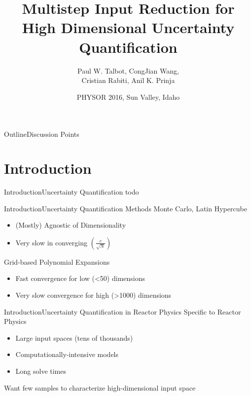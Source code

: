 \documentclass{beamer}
\title[Multistep Input Reduction]
{Multistep Input Reduction for High Dimensional Uncertainty Quantification}
\author[Talbot] %
{Paul W. Talbot\inst{1}, CongJian Wang\inst{2}, \\ Cristian Rabiti\inst{2}, Anil K. Prinja\inst{1}}
\institute[University of New Mexico] %
{
  \inst{1}%
  University of New Mexico\\
  \inst{2}
  Idaho National Laboratory
}
\date[PHYSOR 2016] %
{PHYSOR 2016, Sun Valley, Idaho}
\begin{document}
\begin{frame}
  \titlepage
\end{frame}

\begin{frame}{Outline}{Discussion Points}\vspace{-20pt}
  \tableofcontents%
\end{frame}

\section{Introduction}
\begin{frame}{Introduction}{Uncertainty Quantification}\vspace{-30pt}
  todo
\end{frame}
\begin{frame}{Introduction}{Uncertainty Quantification Methods}\vspace{-30pt}
  Monte Carlo, Latin Hypercube
  \begin{itemize}
    \item (Mostly) Agnostic of Dimensionality
    \item Very slow in converging $\left(\frac{c}{\sqrt{N}}\right)$
  \end{itemize}
  \vspace{15pt}
  Grid-based Polynomial Expansions
  \begin{itemize}
    \item Fast convergence for low (<50) dimensions
    \item Very slow convergence for high (>1000) dimensions
  \end{itemize}
\end{frame}
\begin{frame}{Introduction}{Uncertainty Quantification in Reactor Physics}\vspace{-30pt}
  Specific to Reactor Physics
  \begin{itemize}
    \item Large input spaces (tens of thousands)
    \item Computationally-intensive models
    \item Long solve times
  \end{itemize}
  \vspace{15pt}
  Want few samples to characterize high-dimensional input space
\end{frame}
\end{document}
